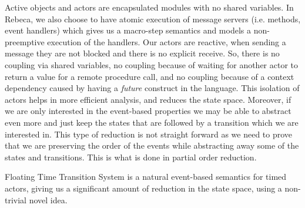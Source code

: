 Active objects and actors are encapsulated modules with no shared variables. In Rebeca, we also choose to have atomic execution of message servers (i.e. methods, event handlers) which gives us a macro-step semantics and models a non-preemptive execution of the handlers.
Our actors are reactive, when sending a message they are not blocked and there is no explicit receive. So, there is no coupling via shared variables, no coupling because of waiting for another actor to return a value for a remote procedure call, and no coupling because of a context dependency caused by having a \textit{future}  construct in the language.
This isolation of actors helps in more efficient analysis, and reduces the state space.
Moreover, if we are only interested in the event-based properties we may be able to abstract even more and just keep the states that are followed by a transition which we are interested in. This type of reduction is not straight forward as we need to prove that we are preserving the order of the events while abstracting away some of the states and transitions. This is what is done in partial order reduction.

Floating Time Transition System is a natural event-based semantics for timed actors, giving us a significant amount of reduction in the state space, using a non-trivial novel idea.
	